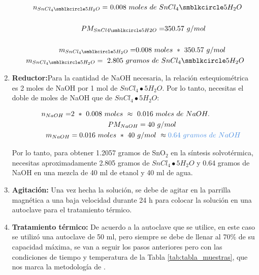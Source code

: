 \documentclass[12pt]{article}
\begin{document}
\begin{enumerate}
        \begin{gather}
        \ \ \ {\displaystyle n_{SnCl_{4} \smblkcircle 5H_{2} O} =} \ {\displaystyle 0.008\ moles\ de\ SnCl_{4} \smblkcircle 5H_{2} O}\\
        \ \ \ \ \ \ \ \  \notag\\
        \ \ \ \ \ \ \ \ {\displaystyle PM_{SnCl4\smblkcircle 5H2O} =} 350.57\ g/mol\\
        \ \ \ \ \ \ \ \  \notag\\
        \ \ \ \ \ \ \ \ {\displaystyle m_{SnCl_{4} \smblkcircle 5H_{2} O} =} 0.008\ moles\ *\ 350.57\ g/mol\ \\
        \ {\displaystyle m_{SnCl_{4} \smblkcircle 5H_{2} O}} =\ 2.805\ gramos\ de\ {\displaystyle SnCl_{4} \smblkcircle 5H_{2} O}
        \end{gather}

        
        \item \textbf{Reductor:}Para la cantidad de NaOH necesaria, la relación estequiométrica es 2 moles de NaOH por 1 mol de $\displaystyle SnCl_{4} \smblkcircle 5H_{2} O$. Por lo tanto, necesitas el doble de moles de NaOH que de $\displaystyle SnCl_{4} \smblkcircle 5H_{2} O$:
        
        \begin{gather}
        {\displaystyle n_{NaOH} =} 2\ *\ 0.008\ moles\ \approx \ 0.016\ moles\ de\ NaOH.\ \ \ \ \ \ \ \\
        \ \ \ \ \ \ \ \ {\displaystyle PM_{NaOH} =40\ g/mol} \ \\
        \ \ \ \ \ \ \ \ {\displaystyle m_{NaOH}} =0.016\ moles\ *\ 40\ g/mol\ \approx \textcolor[rgb]{0.29,0.56,0.89}{0.64\ gramos\ de\ NaOH}
        \end{gather}
        
        Por lo tanto, para obtener 1.2057 gramos de SnO$\displaystyle _{2}$ en la síntesis solvotérmica, necesitas aproximadamente 2.805 gramos de $\displaystyle SnCl_{4} \smblkcircle 5H_{2} O$ y 0.64 gramos de NaOH en una mezcla de 40 ml de etanol y 40 ml de agua. 
        \item\textbf{Agitación:} Una vez hecha la solución, se debe de agitar en la parrilla magnética a una baja velocidad durante 24 h para colocar la solución en una autoclave para el tratamiento térmico.
        
        \item\textbf{Tratamiento térmico:} De acuerdo a la autoclave que se utilice, en este caso se utilizó una autoclave de 50 ml, pero siempre se debe de llenar al 70\% de su capacidad máxima, se van a seguir los pasos anteriores pero con las condiciones de tiempo y temperatura de la Tabla \ref{tab:tabla_muestras}, que nos marca la metodología de \cite{IEEEreferencias:Ref36}.
        

\end{enumerate}
\end{document}
